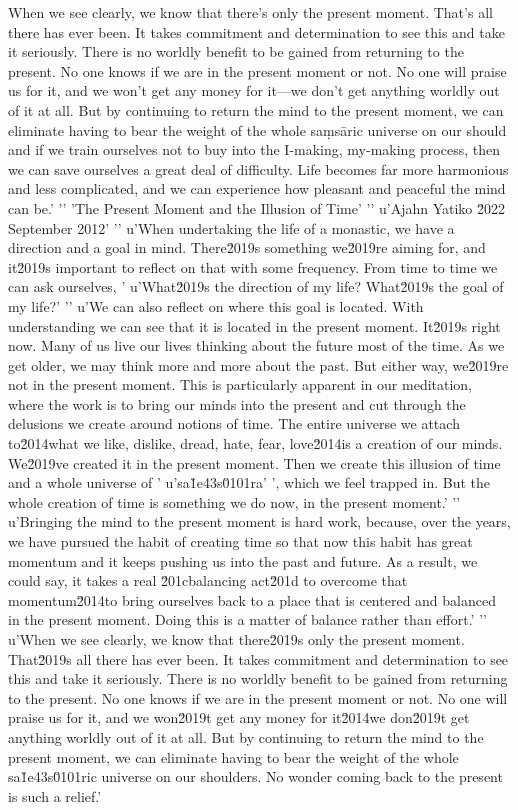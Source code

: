 When we see clearly, we know that there's only the present moment. 
That's all there has ever been. It takes commitment and determination 
to see this and take it seriously. There is no worldly benefit to be 
gained from returning to the present. No one knows if we are in the 
present moment or not. No one will praise us for it, and we won't get 
any money for it---we don't get anything worldly out of it at all. But 
by continuing to return the mind to the present moment, we can 
eliminate having to bear the weight of the whole saṃsāric universe 
on our should and if we train ourselves not to buy into the I-making, my-making process, then we can save ourselves a great deal of difficulty. Life becomes far more harmonious and less complicated, and we can experience how pleasant and peaceful the mind can be.'
'\n'
'The Present Moment and the Illusion of Time'
'\n'
u'Ajahn Yatiko \u2022 September 2012'
'\n'
u'When undertaking the life of a monastic, we have a direction and a goal in mind. There\u2019s something we\u2019re aiming for, and it\u2019s important to reflect on that with some frequency. From time to time we can ask ourselves, '
u'What\u2019s the direction of my life? What\u2019s the goal of my life?'
'\n'
u'We can also reflect on where this goal is located. With understanding we can see that it is located in the present moment. It\u2019s right now. Many of us live our lives thinking about the future most of the time. As we get older, we may think more and more about the past. But either way, we\u2019re not in the present moment. This is particularly apparent in our meditation, where the work is to bring our minds into the present and cut through the delusions we create around notions of time. The entire universe we attach to\u2014what we like, dislike, dread, hate, fear, love\u2014is a creation of our minds. We\u2019ve created it in the present moment. Then we create this illusion of time and a whole universe of '
u'sa\u1e43s\u0101ra'
', which we feel trapped in. But the whole creation of time is something we do now, in the present moment.'
'\n'
u'Bringing the mind to the present moment is hard work, because, over the years, we have pursued the habit of creating time so that now this habit has great momentum and it keeps pushing us into the past and future. As a result, we could say, it takes a real \u201cbalancing act\u201d to overcome that momentum\u2014to bring ourselves back to a place that is centered and balanced in the present moment. Doing this is a matter of balance rather than effort.'
'\n'
u'When we see clearly, we know that there\u2019s only the present moment. That\u2019s all there has ever been. It takes commitment and determination to see this and take it seriously. There is no worldly benefit to be gained from returning to the present. No one knows if we are in the present moment or not. No one will praise us for it, and we won\u2019t get any money for it\u2014we don\u2019t get anything worldly out of it at all. But by continuing to return the mind to the present moment, we can eliminate having to bear the weight of the whole sa\u1e43s\u0101ric universe on our shoulders. No wonder coming back to the present is such a relief.'
